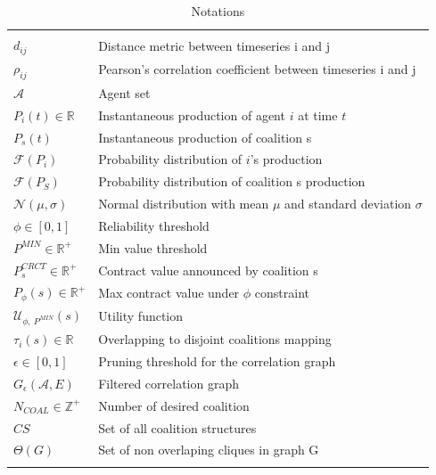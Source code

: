 \documentclass[conference]{IEEEtran}
\begin{document}
\begin{table}[t]
\centering
\scriptsize
\begin{tabular}{l|p{4.5cm}}
  \hline 
  \\
  $ d_{ij} $ & Distance metric between timeseries i and j \\
  $ \rho_{ij} $ & Pearson's correlation coefficient between timeseries i and j \\
  $ \mathcal{A} $ & Agent set \\
  $ P_{i}(t) \in \mathbb{R} $ & Instantaneous production of agent $i$ at time $t$ \\
  $ P_{s}(t) $ & Instantaneous production of coalition s \\
  $ \mathcal{F}(P_{i}) $ & Probability distribution of $i$'s production \\
  $ \mathcal{F}(P_{S}) $ & Probability distribution of coalition s production \\
  $ \mathcal{N}(\mu, \sigma) $ & Normal distribution with mean $ \mu $ and standard deviation $ \sigma $ \\
  $ \phi \in [0,1] $ & Reliability threshold \\
  $ P^{MIN} \in \mathbb{R}^+ $ & Min value threshold \\
  $ P_{s}^{CRCT} \in \mathbb{R}^+ $ & Contract value announced by coalition s \\
  $ P_{\phi}(s) \in \mathbb{R}^+ $ & Max contract value under $ \phi $ constraint \\
  $ \mathcal{U}_{\phi,\ P^{MIN}}(s) $ & Utility function \\
  $ \tau_{i}(s) \in \mathbb{R}$ & Overlapping to disjoint coalitions mapping \\
  $ \epsilon \in [0,1] $ & Pruning threshold for the correlation graph \\
  $ G_{\epsilon}(\mathcal{A}, E) $ & Filtered correlation graph \\
  $ N_{COAL} \in \mathbb{Z}^+ $ & Number of desired coalition \\
  $ CS $ & Set of all coalition structures \\
  $ \Theta(G) $ & Set of non overlaping cliques in graph G \\
  \\
  \hline
\end{tabular}

\caption{Notations\label{table1}}
\end{table}
\end{document}
